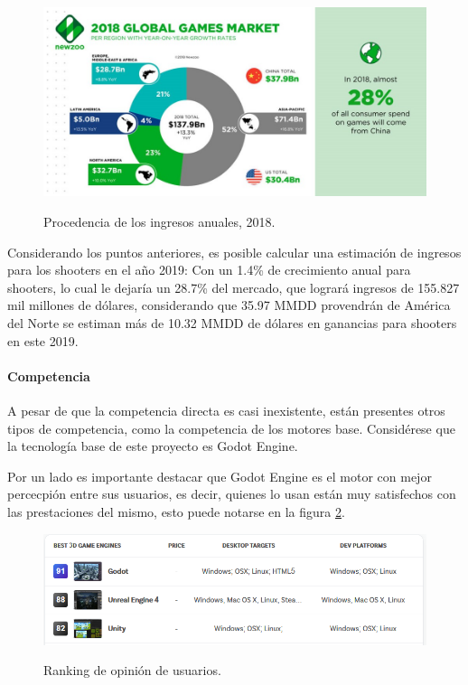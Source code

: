 \documentclass[]{article}
\begin{document}
\begin{figure}[H]
	
	\centering
	\includegraphics[width=1\textwidth]{GGM2}
	\caption{Procedencia de los ingresos anuales, 2018.  } \cite{Newzoo} 
	\label{ENWZOO}
	
\end{figure}

Considerando los puntos anteriores, es posible calcular una estimaci\'on de ingresos para los shooters en el a\~no 2019:
Con un 1.4\% de crecimiento anual para shooters, lo cual le dejar\'ia un 28.7\% del mercado, que lograr\'a ingresos de 155.827 mil millones de d\'olares, considerando que 35.97 MMDD provendr\'an de Am\'erica del Norte se estiman m\'as de 10.32 MMDD de d\'olares en ganancias para shooters en este 2019. 
\paragraph{Competencia}
A pesar de que la competencia directa es casi inexistente, est\'an presentes otros tipos de competencia, como la competencia de los motores base. Consid\'erese que la tecnolog\'ia base de este proyecto es Godot Engine.

Por un lado es importante destacar que Godot Engine es el motor con mejor percecpi\'on entre sus usuarios, es decir, quienes lo usan est\'an muy satisfechos con las prestaciones del mismo, esto puede notarse en la figura \ref{SLANT}.
 
\begin{figure}[H]
	
	\centering
	\includegraphics[width=1\textwidth]{Ranking}
	\caption{Ranking de opini\'on de usuarios.  } \cite{Slant} 
	\label{SLANT}
	
\end{figure}
\end{document}
